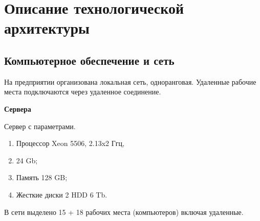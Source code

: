 \newpage

\chapter{Описание технологической архитектуры}

\section{Компьютерное обеспечение и сеть}

На предприятии организована локальная сеть, одноранговая. 
Удаленные рабочие места подключаются через удаленное соединение.






\textbf{Сервера}



Сервер с параметрами. 
\begin{enumerate}
\item Процессор Xeon 5506, 2.13x2  Ггц, 
\item  24 Gb;
\item Память 128 GB;
\item Жесткие диски 2 HDD 6 Tb.
\end{enumerate}


В сети выделено 15 + 18 рабочих места (компьютеров) включая удаленные.



